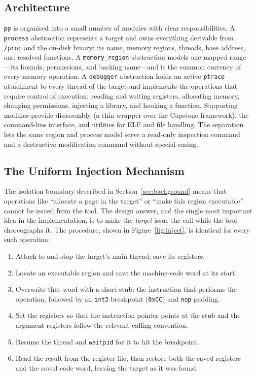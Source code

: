 \documentclass[10pt,twocolumn,a4paper]{article}
\begin{document}
\subsection{Architecture}
\texttt{pp} is organised into a small number of modules with clear
responsibilities. A \texttt{process} abstraction represents a target and owns
everything derivable from \texttt{/proc} and the on-disk binary: its name,
memory regions, threads, base address, and resolved functions. A
\texttt{memory\_region} abstraction models one mapped range---its bounds,
permissions, and backing name---and is the common currency of every memory
operation. A \texttt{debugger} abstraction holds an active \texttt{ptrace}
attachment to every thread of the target and implements the operations that
require control of execution: reading and writing registers, allocating memory,
changing permissions, injecting a library, and hooking a function. Supporting
modules provide disassembly (a thin wrapper over the Capstone
framework), the command-line interface, and utilities for ELF
and file handling. The separation lets the same region and process model serve a
read-only inspection command and a destructive modification command without
special-casing.

\subsection{The Uniform Injection Mechanism}\label{sec:mechanism}
The isolation boundary described in Section~\ref{sec:background} means that
operations like ``allocate a page in the target'' or ``make this region
executable'' cannot be issued from the tool. The design answer, and the single
most important idea in the implementation, is to make the \emph{target} issue
the call while the tool choreographs it. The procedure, shown in
Figure~\ref{fig:inject}, is identical for every such operation:

\begin{enumerate}
  \item Attach to and stop the target's main thread; save its registers.
  \item Locate an executable region and save the machine-code word at its start.
  \item Overwrite that word with a short stub: the instruction that performs the
  operation, followed by an \texttt{int3} breakpoint (\texttt{0xCC}) and
  \texttt{nop} padding.
  \item Set the registers so that the instruction pointer points at the stub and
  the argument registers follow the relevant calling convention.
  \item Resume the thread and \texttt{waitpid} for it to hit the breakpoint.
  \item Read the result from the register file, then restore both the saved
  registers and the saved code word, leaving the target as it was found.
\end{enumerate}
\end{document}
